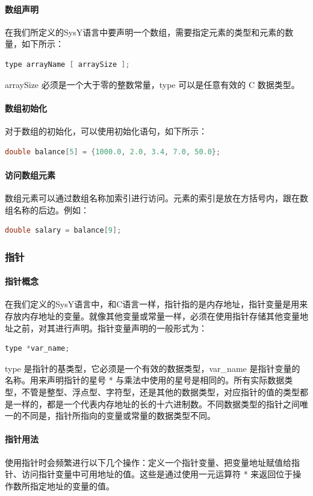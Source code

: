 \documentclass[UTF8,a4paper,10pt]{ctexart}
\begin{document}
\paragraph{数组声明}
在我们所定义的SysY语言中要声明一个数组，需要指定元素的类型和元素的数量，如下所示：
\begin{lstlisting}[language = c++]
type arrayName [ arraySize ];
\end{lstlisting}
arraySize 必须是一个大于零的整数常量，type 可以是任意有效的 C 数据类型。


\paragraph{数组初始化}
对于数组的初始化，可以使用初始化语句，如下所示：
\begin{lstlisting}[language = c++]
double balance[5] = {1000.0, 2.0, 3.4, 7.0, 50.0};
\end{lstlisting}

\paragraph{访问数组元素}
数组元素可以通过数组名称加索引进行访问。元素的索引是放在方括号内，跟在数组名称的后边。例如：
\begin{lstlisting}[language = c++]
double salary = balance[9];
\end{lstlisting}


\subsubsection{指针}
\paragraph{指针概念}
在我们定义的SysY语言中，和C语言一样，指针指的是内存地址，指针变量是用来存放内存地址的变量。就像其他变量或常量一样，必须在使用指针存储其他变量地址之前，对其进行声明。指针变量声明的一般形式为：
\begin{lstlisting}[language = c++]
type *var_name;
\end{lstlisting}
type 是指针的基类型，它必须是一个有效的数据类型，var\_name 是指针变量的名称。用来声明指针的星号 * 与乘法中使用的星号是相同的。所有实际数据类型，不管是整型、浮点型、字符型，还是其他的数据类型，对应指针的值的类型都是一样的，都是一个代表内存地址的长的十六进制数。不同数据类型的指针之间唯一的不同是，指针所指向的变量或常量的数据类型不同。
\paragraph{指针用法}
使用指针时会频繁进行以下几个操作：定义一个指针变量、把变量地址赋值给指针、访问指针变量中可用地址的值。这些是通过使用一元运算符 * 来返回位于操作数所指定地址的变量的值。
\end{document}
